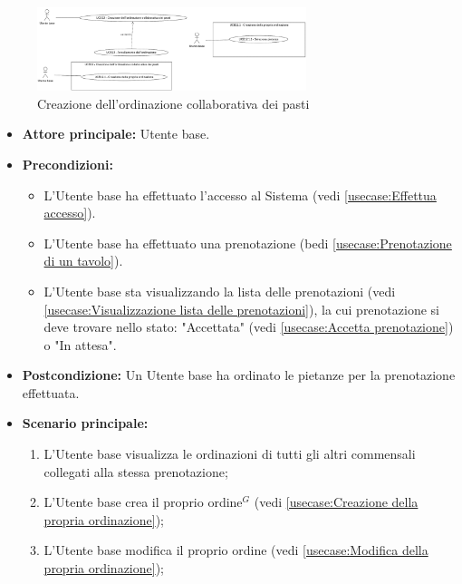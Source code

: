 \newpage
{}
\label{usecase:Creazione dell'ordinazione collaborativa dei pasti}

\begin{figure}[h]
	\centering
	\includegraphics[width=0.7\textwidth]{./uml/UCB12-13.png} 
	\caption{Creazione dell'ordinazione collaborativa dei pasti}
	\label{fig:UCB12-13}
  \end{figure}

\begin{itemize}
	\item \textbf{Attore principale:} Utente base.

	\item \textbf{Precondizioni:}
	      \begin{itemize}
		      \item L'Utente base ha effettuato l'accesso al Sistema (vedi \autoref{usecase:Effettua accesso}).
		      \item L'Utente base ha effettuato una prenotazione (bedi \autoref{usecase:Prenotazione di un tavolo}).
		      \item L'Utente base sta visualizzando la lista delle prenotazioni (vedi \autoref{usecase:Visualizzazione lista delle prenotazioni}), la cui prenotazione si deve trovare nello stato: "Accettata"  (vedi \autoref{usecase:Accetta prenotazione}) o "In attesa".
	      \end{itemize}

	\item \textbf{Postcondizione:} Un Utente base ha ordinato le pietanze per la prenotazione effettuata.

	\item \textbf{Scenario principale:}
	      \begin{enumerate}
		      \item L'Utente base visualizza le ordinazioni di tutti gli altri commensali collegati alla stessa prenotazione;
		      \item L'Utente base crea il proprio ordine$^G$ (vedi \autoref{usecase:Creazione della propria ordinazione});
		      \item L'Utente base modifica il proprio ordine (vedi \autoref{usecase:Modifica della propria ordinazione});


\end{enumerate}
\end{itemize}

